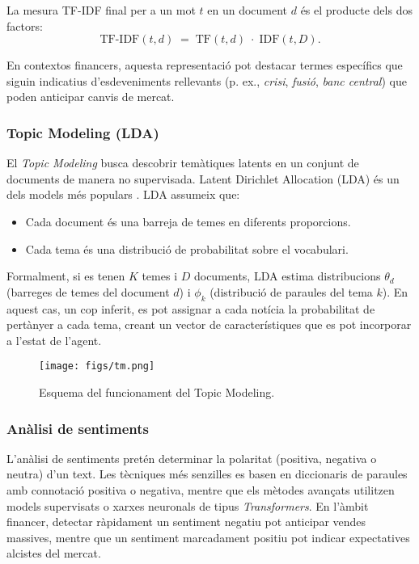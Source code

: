 \documentclass[12pt,a4paper,twoside]{book}
\begin{document}
La mesura TF-IDF final per a un mot $t$ en un document $d$ és el producte dels dos factors:
\[
\mathrm{TF\text{-}IDF}(t,d) \;=\; \mathrm{TF}(t,d)\;\cdot\;\mathrm{IDF}(t,D).
\]

En contextos financers, aquesta representació pot destacar termes específics que siguin indicatius d'esdeveniments rellevants (p. ex., \emph{crisi}, \emph{fusió}, \emph{banc central}) que poden anticipar canvis de mercat.

\subsubsection{Topic Modeling (LDA)}

El \emph{Topic Modeling} busca descobrir temàtiques latents en un conjunt de documents de manera no supervisada. Latent Dirichlet Allocation (LDA) és un dels models més populars \cite{Blei2003}. LDA assumeix que:

\begin{itemize}
\item Cada document és una barreja de temes en diferents proporcions.
\item Cada tema és una distribució de probabilitat sobre el vocabulari.
\end{itemize}

Formalment, si es tenen $K$ temes i $D$ documents, LDA estima distribucions $\theta_d$ (barreges de temes del document $d$) i $\phi_k$ (distribució de paraules del tema $k$). En aquest cas, un cop inferit, es pot assignar a cada notícia la probabilitat de pertànyer a cada tema, creant un vector de característiques que es pot incorporar a l'estat de l'agent.

\begin{figure}[H]
	\centering
	\texttt{[image: figs/tm.png]}
	\caption{Esquema del funcionament del Topic Modeling\cite{esquemaRL}.}
	\label{fig:context-anoni1}
\end{figure}

\subsubsection{Anàlisi de sentiments}

L'anàlisi de sentiments pretén determinar la polaritat (positiva, negativa o neutra) d'un text. Les tècniques més senzilles es basen en diccionaris de paraules amb connotació positiva o negativa, mentre que els mètodes avançats utilitzen models supervisats o xarxes neuronals de tipus \emph{Transformers}. En l'àmbit financer, detectar ràpidament un sentiment negatiu pot anticipar vendes massives, mentre que un sentiment marcadament positiu pot indicar expectatives alcistes del mercat.
\end{document}
